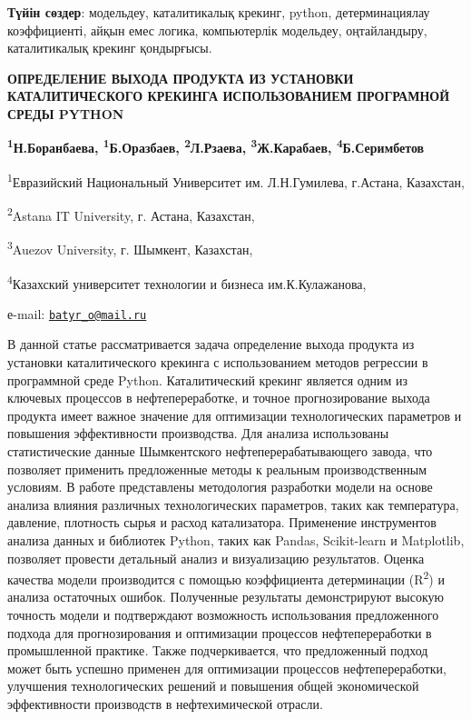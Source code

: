 {\bfseries Түйін сөздер}: модельдеу, каталитикалық крекинг, python,
детерминациялау коэффициенті, айқын емес логика, компьютерлік модельдеу,
оңтайландыру, каталитикалық крекинг қондырғысы.

\begin{articleheader}
{\bfseries ОПРЕДЕЛЕНИЕ ВЫХОДА ПРОДУКТА ИЗ УСТАНОВКИ КАТАЛИТИЧЕСКОГО
КРЕКИНГА ИСПОЛЬЗОВАНИЕМ ПРОГРАМНОЙ СРЕДЫ PYTHON}

{\bfseries \textsuperscript{1}Н.Боранбаева,
\textsuperscript{1}Б.Оразбаев\textsuperscript{\envelope },
\textsuperscript{2}Л.Рзаева, \textsuperscript{3}Ж.Карабаев,
\textsuperscript{4}Б.Серимбетов}
\end{articleheader}

\begin{affiliation}
\textsuperscript{1}Евразийский Национальный Университет им.
Л.Н.Гумилева, г.Астана, Казахстан,

\textsuperscript{2}Astana IT University, г. Астана, Казахстан,

\textsuperscript{3}Auezov University, г. Шымкент, Казахстан,

\textsuperscript{4}Казахский университет технологии и бизнеса
им.К.Кулажанова,

е-mail: \href{mailto:batyr_o@mail.ru}{\nolinkurl{batyr\_o@mail.ru}}
\end{affiliation}

В данной статье рассматривается задача определение выхода продукта из
установки каталитического крекинга с использованием методов регрессии в
программной среде Python. Каталитический крекинг является одним из
ключевых процессов в нефтепереработке, и точное прогнозирование выхода
продукта имеет важное значение для оптимизации технологических
параметров и повышения эффективности производства. Для анализа
использованы статистические данные Шымкентского нефтеперерабатывающего
завода, что позволяет применить предложенные методы к реальным
производственным условиям. В работе представлены методология разработки
модели на основе анализа влияния различных технологических параметров,
таких как температура, давление, плотность сырья и расход катализатора.
Применение инструментов анализа данных и библиотек Python, таких как
Pandas, Scikit-learn и Matplotlib, позволяет провести детальный анализ и
визуализацию результатов. Оценка качества модели производится с помощью
коэффициента детерминации (R\textsuperscript{2}) и анализа остаточных
ошибок. Полученные результаты демонстрируют высокую точность модели и
подтверждают возможность использования предложенного подхода для
прогнозирования и оптимизации процессов нефтепереработки в промышленной
практике\emph{.} Также подчеркивается, что предложенный подход может
быть успешно применен для оптимизации процессов нефтепереработки,
улучшения технологических решений и повышения общей экономической
эффективности производств в нефтехимической отрасли.

